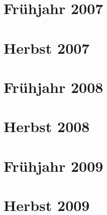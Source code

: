 \documentclass{lehramt-informatik-examen-sammlung}
\begin{document}
\section{Frühjahr 2007}


\section{Herbst 2007}


\section{Frühjahr 2008}


\section{Herbst 2008}


\section{Frühjahr 2009}


\section{Herbst 2009}

\end{document}
